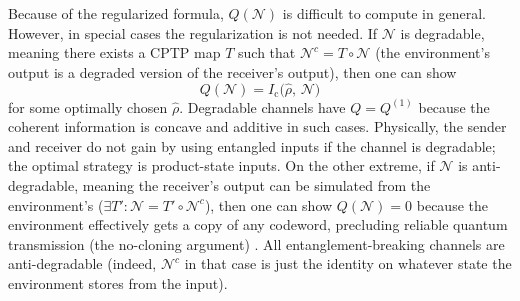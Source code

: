 \documentclass[11pt]{article}
\theoremstyle{plain}
\theoremstyle{definition}
\numberwithin{equation}{section}
\begin{document}
    Because of the regularized formula, $Q(\mathcal{N})$ is difficult to compute in general. However, in special cases the regularization is not needed. If $\mathcal{N}$ is degradable, meaning there exists a CPTP map $T$ such that $\mathcal{N}^c = T \circ \mathcal{N}$ (the environment’s output is a degraded version of the receiver’s output), then one can show 
    \[
  Q(\mathcal{N}) = I_{\mathrm{c}}\bigl(\hat{\rho},\,\mathcal{N}\bigr)
\] for some optimally chosen $\hat{\rho}$. Degradable channels have $Q = Q^{(1)}$ because the coherent information is concave and additive in such cases. Physically, the sender and receiver do not gain by using entangled inputs if the channel is degradable; the optimal strategy is product-state inputs. On the other extreme, if $\mathcal{N}$ is anti-degradable, meaning the receiver’s output can be simulated from the environment’s ($\exists T': \mathcal{N} = T' \circ \mathcal{N}^c$), then one can show $Q(\mathcal{N}) = 0$ because the environment effectively gets a copy of any codeword, precluding reliable quantum transmission (the no-cloning argument) \cite{11}. All entanglement-breaking channels are anti-degradable (indeed, $\mathcal{N}^c$ in that case is just the identity on whatever state the environment stores from the input).
\end{document}
